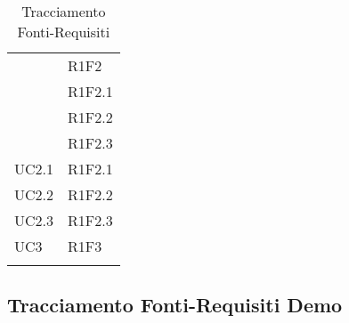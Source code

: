 \begin{longtable}{|>{\centering}m{5cm}|m{5cm}<{\centering}|}
{UC2}&{R1F2}\\
&{R1F2.1}\\
&{R1F2.2}\\
&{R1F2.3}\\ \hline
{UC2.1}&{R1F2.1}\\ \hline
{UC2.2}&{R1F2.2}\\ \hline
{UC2.3}&{R1F2.3}\\ \hline

{UC3}&{R1F3}\\ \hline

\caption[Tracciamento Fonti-Requisiti]{Tracciamento Fonti-Requisiti}
\label{tabella: Tracciamento Fonti-Requisiti}
\end{longtable}


\subsection{Tracciamento Fonti-Requisiti Demo}
\normalsize
